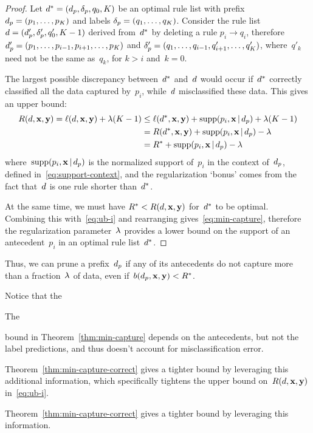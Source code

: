 \begin{arxiv}
\begin{proof}
Let ${d^* = (d_p, \delta_p, q_0, K)}$ be an optimal
rule list with prefix ${d_p = (p_1, \dots, p_K)}$
and labels ${\delta_p = (q_1, \dots, q_K)}$.
%
Consider the rule list ${{d} = (d_p', \delta_p', q_0', K-1)}$
derived from~$d^*$ by deleting a rule ${p_i \rightarrow q_i}$,
therefore ${d_p' = (p_1, \dots, p_{i-1}, p_{i+1}, \dots, p_K)}$
and ${\delta_p' = (q_1, \dots, q_{i-1}, q'_{i+1}, \dots, q'_K)}$,
where~$q'_k$ need not be the same as~$q_k$, for ${k > i}$ and~${k = 0}$.

The largest possible discrepancy between~$d^*$ and~${d}$ would occur
if~$d^*$ correctly classified all the data captured by~$p_i$,
while~${d}$ misclassified these data.
%
This gives an upper bound:
\begin{align}
R({d}, \mathbf{x}, \mathbf{y}) = \ell({d}, \mathbf{x}, \mathbf{y}) + {\lambda} (K - 1)
&\le \ell(d^*, \mathbf{x}, \mathbf{y}) + \textnormal{supp}(p_i, \mathbf{x} \,|\, d_p) + {\lambda}(K - 1) \nonumber \\
&= R(d^*, \mathbf{x}, \mathbf{y}) + \textnormal{supp}(p_i, \mathbf{x} \,|\, d_p) - {\lambda} \nonumber \\
&= R^* + \textnormal{supp}(p_i, \mathbf{x} \,|\, d_p) - {\lambda}
\label{eq:ub-i}
\end{align}
where~$\textnormal{supp}(p_i, \mathbf{x} \,|\, d_p)$ is the normalized support of~$p_i$
in the context of~$d_p$, defined in~\eqref{eq:support-context},
and the regularization `bonus' comes from the fact that~${d}$
is one rule shorter than~$d^*$.

At the same time, we must have ${R^* < R({d}, \mathbf{x}, \mathbf{y})}$ for~$d^*$ to be optimal.
%
Combining this with~\eqref{eq:ub-i} and rearranging gives~\eqref{eq:min-capture},
therefore the regularization parameter~${\lambda}$ provides a lower bound
on the support of an antecedent~$p_i$ in an optimal rule list~$d^*$.
\end{proof}
\end{arxiv}

Thus, we can prune a prefix~$d_p$ if any of its antecedents do not capture
more than a fraction~${\lambda}$ of data, even if~${b(d_p, \mathbf{x}, \mathbf{y}) < R^*}$.
%
\begin{arxiv}
Notice that the
\end{arxiv}
\begin{kdd}
The
\end{kdd}
bound in Theorem~\ref{thm:min-capture}
depends on the antecedents, but not the label predictions,
and thus doesn't account for misclassification error.
%
\begin{arxiv}
Theorem~\ref{thm:min-capture-correct} gives a tighter bound
by leveraging this additional information, which specifically
tightens the upper bound on~$R({d}, \mathbf{x}, \mathbf{y})$ in~\eqref{eq:ub-i}.
\end{arxiv}
\begin{kdd}
Theorem~\ref{thm:min-capture-correct} gives a tighter bound
by leveraging this information.
\end{kdd}

